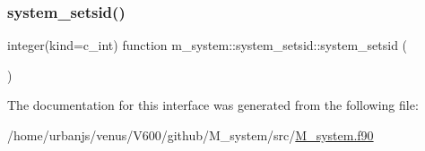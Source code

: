\subsubsection{\texorpdfstring{system\+\_\+setsid()}{system\_setsid()}}
{\footnotesize\ttfamily integer(kind=c\+\_\+int) function m\+\_\+system\+::system\+\_\+setsid\+::system\+\_\+setsid (\begin{DoxyParamCaption}{ }\end{DoxyParamCaption})\hspace{0.3cm}{\ttfamily [private]}}



The documentation for this interface was generated from the following file\+:\begin{DoxyCompactItemize}
\item 
/home/urbanjs/venus/\+V600/github/\+M\+\_\+system/src/\mbox{\hyperlink{M__system_8f90}{M\+\_\+system.\+f90}}\end{DoxyCompactItemize}
